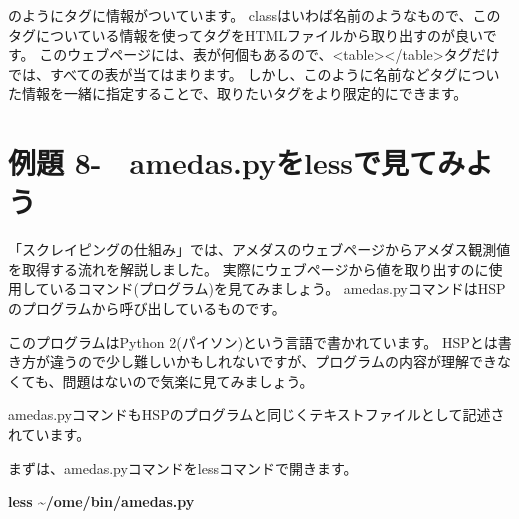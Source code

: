 \documentclass[a4paper,12pt,dvipdfmx]{jarticle}
\newcounter{Exercise}
\renewcommand\theExercise{例題 8-\arabic{Exercise}}
\begin{document}
のようにタグに情報がついています。
classはいわば名前のようなもので、このタグについている情報を使ってタグをHTMLファイルから取り出すのが良いです。
このウェブページには、表が何個もあるので、{\textless}table{\textgreater}{\textless}/table{\textgreater}タグだけでは、すべての表が当てはまります。
しかし、このように名前などタグについた情報を一緒に指定することで、取りたいタグをより限定的にできます。


\bigskip


\bigskip
{}
\clearpage\section{\theExercise　amedas.pyをlessで見てみよう}
「スクレイピングの仕組み」では、アメダスのウェブページからアメダス観測値を取得する流れを解説しました。
実際にウェブページから値を取り出すのに使用しているコマンド(プログラム)を見てみましょう。
amedas.pyコマンドはHSPのプログラムから呼び出しているものです。

このプログラムはPython
2(パイソン)という言語で書かれています。
HSPとは書き方が違うので少し難しいかもしれないですが、プログラムの内容が理解できなくても、問題はないので気楽に見てみましょう。


\bigskip

amedas.pyコマンドもHSPのプログラムと同じくテキストファイルとして記述されています。

まずは、amedas.pyコマンドをlessコマンドで開きます。


\bigskip

\textbf{less \~{}/ome/bin/amedas.py}
\end{document}
